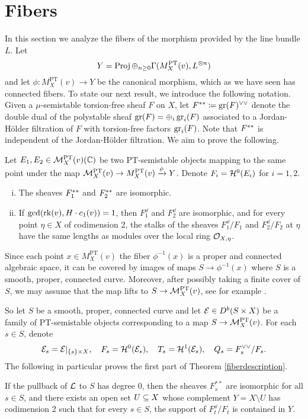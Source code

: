 \section{Fibers}
In this section we analyze the fibers of the morphism provided by the line bundle $L$. Let 
\[ Y = \operatorname{\mathrm{Proj}} \oplus_{n \ge 0} \Gamma(M^{\text{PT}}_X(v), L^{\otimes n}) \]
and let $\phi: M^{\text{PT}}_X(v) \to Y$ be the canonical morphism, which as we have seen has connected fibers. To state our next result, we introduce the following notation. Given a $\mu$-semistable torsion-free sheaf $F$ on $X$, let $F^{\ast\ast} \coloneqq \operatorname{\mathrm{gr}}(F)^{\vee\vee}$ denote the double dual of the polystable sheaf $\operatorname{\mathrm{gr}}(F) = \oplus_i \operatorname{\mathrm{gr}}_i(F)$ associated to a Jordan-H\"older filtration of $F$ with torsion-free factors $\operatorname{\mathrm{gr}}_i(F)$. Note that $F^{\ast\ast}$ is independent of the Jordan-H\"older filtration. We aim to prove the following.
\begin{thm}\label{fiberdescription}
Let $E_1, E_2 \in \mathcal{M}^{\text{PT}}_X(v)(\mathbb{C})$ be two PT-semistable objects mapping to the same point under the map $\mathcal{M}^{\text{PT}}_X(v) \to M^{\text{PT}}_X(v) \xrightarrow{\phi} Y$. Denote $F_i = \mathcal{H}^0(E_i)$ for $i = 1, 2$. 
\begin{enumerate}[(i)]
    \item The sheaves $F_1^{\ast\ast}$ and $F_2^{\ast\ast}$ are isomorphic.
    \item If $\gcd(\operatorname{\mathrm{rk}}(v), H \cdot c_1(v)) = 1$, then $F_1^\dd$ and $F_2^\dd$ are isomorphic, and for every point $\eta \in X$ of codimension 2, the stalks of the sheaves $F_1^\dd/F_1$ and $F_2^\dd/F_2$ at $\eta$ have the same lengths as modules over the local ring $\mathcal{O}_{X,\eta}$.
\end{enumerate}
\end{thm}

Since each point $x \in M^{\text{PT}}_X(v)$ the fiber $\phi^{-1}(x)$ is a proper and connected algebraic space, it can be covered by images of maps $S \to \phi^{-1}(x)$ where $S$ is a smooth, proper, connected curve. %
Moreover, after possibly taking a finite cover of $S$, we may assume that the map lifts to $S \to \mathcal{M}^{\text{PT}}_X(v)$, see for example \cite[Lemma 5.4]{t}.

So let $S$ be a smooth, proper, connected curve and let $\mathcal{E} \in D^b(S \times X)$ be a family of PT-semistable objects corresponding to a map $S \to \mathcal{M}^{\text{PT}}_X(v)$. For each $s \in S$, denote 
\[ \mathcal{E}_s = \mathcal{E}|_{\{s\} \times X}, \quad F_s = \mathcal{H}^0(\mathcal{E}_s), \quad T_s = \mathcal{H}^1(\mathcal{E}_s), \quad Q_s = F_s^{\vee\vee}/F_s. \]
The following in particular proves the first part of Theorem \ref{fiberdescription}.
\begin{prop}\label{dd-S-equiv-Z}
If the pullback of $\mathcal{L}$ to $S$ has degree 0, then the sheaves $F_s^{\ast\ast}$ are isomorphic for all $s \in S$, and there exists an open set $U \subseteq X$ whose complement $Y = X \setminus U$ has codimension 2 such that for every $s \in S$, the support of $F_t^\dd/F_t$ is contained in $Y$.
\end{prop}

